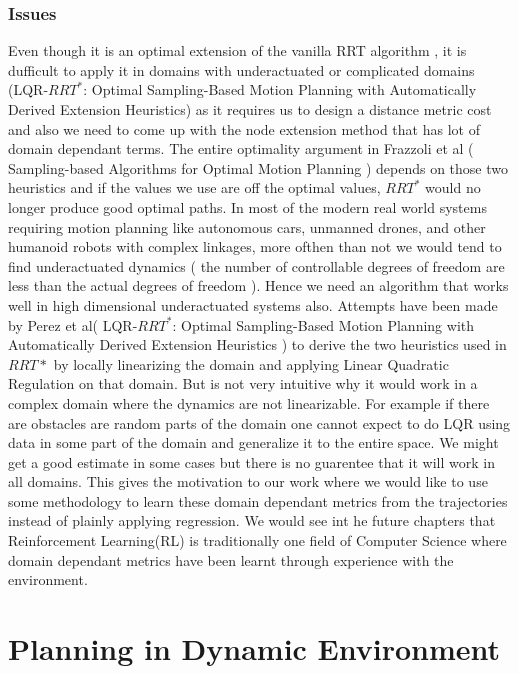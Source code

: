 \documentclass[MTech]{iitmdiss}
\begin{document}
\subsection{Issues}
 
 Even though it is an optimal extension of the vanilla RRT algorithm , it is dufficult to apply it in domains with underactuated or complicated domains (LQR-$RRT^*$: Optimal Sampling-Based Motion Planning with Automatically Derived Extension Heuristics) as it requires us to design a distance metric cost and also we need to come up with the node extension method that has lot of domain dependant terms. The entire optimality argument in Frazzoli et al ( Sampling-based Algorithms for Optimal Motion Planning ) depends on those two heuristics and if the values we use are off the optimal values, $RRT^*$ would no longer produce good optimal paths. In most of the modern real world systems requiring motion planning like autonomous cars, unmanned drones, and other humanoid robots with complex linkages, more ofthen than not we would tend to find underactuated dynamics ( the number of controllable degrees of freedom are less than the actual degrees of freedom ). Hence we need an algorithm that works well in high dimensional underactuated systems also. Attempts have been made by Perez et al( LQR-$RRT^*$: Optimal Sampling-Based Motion Planning with Automatically Derived Extension Heuristics ) to derive the two heuristics used in $RRT*$ by locally linearizing the domain and applying Linear Quadratic Regulation on that domain. But is not very intuitive why it would work in a complex domain where the dynamics are not linearizable. For example if there are obstacles are random parts of the domain one cannot expect to do LQR using data in some part of the domain and generalize it to the entire space. We might get a good estimate in some cases but there is no guarentee that it will work in all domains. This gives the motivation to our work where we would like to use some methodology to learn these domain dependant metrics from the trajectories instead of plainly applying regression. We would see int he future chapters that Reinforcement Learning(RL) is traditionally one field of Computer Science where domain dependant metrics have been learnt through experience with the environment. 
 
\chapter{Planning in Dynamic Environment} 
\end{document}
